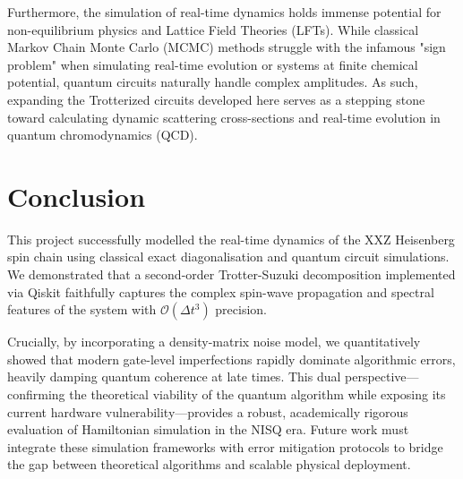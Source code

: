 \documentclass[11pt,a4paper]{article}
\begin{document}
Furthermore, the simulation of real-time dynamics holds immense potential for non-equilibrium physics and Lattice Field Theories (LFTs). While classical Markov Chain Monte Carlo (MCMC) methods struggle with the infamous "sign problem" when simulating real-time evolution or systems at finite chemical potential, quantum circuits naturally handle complex amplitudes. As such, expanding the Trotterized circuits developed here serves as a stepping stone toward calculating dynamic scattering cross-sections and real-time evolution in quantum chromodynamics (QCD).

\section{Conclusion} \label{sec:conclusion}

This project successfully modelled the real-time dynamics of the XXZ Heisenberg spin chain using classical exact diagonalisation and quantum circuit simulations. We demonstrated that a second-order Trotter-Suzuki decomposition implemented via Qiskit faithfully captures the complex spin-wave propagation and spectral features of the system with $\mathcal{O}(\Delta t^3)$ precision. 

Crucially, by incorporating a density-matrix noise model, we quantitatively showed that modern gate-level imperfections rapidly dominate algorithmic errors, heavily damping quantum coherence at late times. This dual perspective—confirming the theoretical viability of the quantum algorithm while exposing its current hardware vulnerability—provides a robust, academically rigorous evaluation of Hamiltonian simulation in the NISQ era. Future work must integrate these simulation frameworks with error mitigation protocols to bridge the gap between theoretical algorithms and scalable physical deployment.
\end{document}
